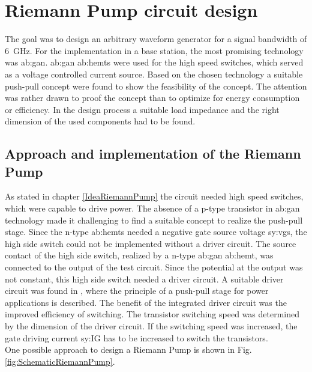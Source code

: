 \chapter{Riemann Pump circuit design}
\label{ch:design}
The goal was to design an arbitrary waveform generator for a signal bandwidth of \SI{6}{\giga \hertz}.
For the implementation in a base station, the most promising technology was \gls{ab:gan}.
\gls{ab:gan} \glspl{ab:hemt} were used for the high speed switches, which served as a voltage controlled current source.
Based on the chosen technology a suitable push-pull concept were found \cite{MaksimovicPaper} to show the feasibility of the concept.
The attention was rather drawn to proof the concept than to optimize for energy consumption or efficiency.
In the design process a suitable load impedance and the right dimension of the used components had to be found.

\section{Approach and implementation of the Riemann Pump}
As stated in chapter \ref{IdeaRiemannPump} the circuit needed high speed switches, which were capable to drive power.
The absence of a p-type transistor in \gls{ab:gan} technology made it challenging to find a suitable concept to realize the push-pull stage.
Since the n-type \glspl{ab:hemt} needed a negative gate source voltage \gls{sy:vgs}, the high side switch could not be implemented without a driver circuit.
The source contact of the high side switch, realized by a n-type \gls{ab:gan} \gls{ab:hemt}, was connected to the output of the test circuit.
Since the potential at the output was not constant, this high side switch needed a driver circuit.
A suitable driver circuit was found in \cite{MaksimovicPaper}, where the principle of a push-pull stage for power applications is described.
The benefit of the integrated driver circuit was the improved efficiency of switching.
The transistor switching speed was determined by the dimension of the driver circuit.
If the switching speed was increased, the gate driving current \gls{sy:IG} has to be increased to switch the transistors.\\
One possible approach to design a Riemann Pump is shown in Fig. \ref{fig:SchematicRiemannPump}.

